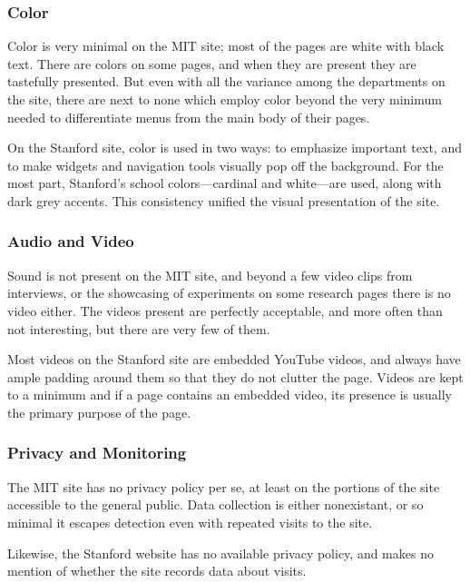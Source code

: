 \subsubsection*{Color}

Color is very minimal on the MIT site; most of the pages are white with black text. There
are colors on some pages, and when they are present they are tastefully presented. But
even with all the variance among the departments on the site, there are next to none
which employ color beyond the very minimum needed to differentiate menus from the main
body of their pages.

On the Stanford site, color is used in two ways: to emphasize important text,
and to make widgets and navigation tools visually pop off the background.
For the most part, Stanford's school colors---cardinal and white---are used,
along with dark grey accents. This consistency unified the visual presentation
of the site.

\subsubsection*{Audio and Video}

Sound is not present on the MIT site, and beyond a few video clips from interviews, or the
showcasing of experiments on some research pages there is no video either. The videos
present are perfectly acceptable, and more often than not interesting, but there are very
few of them.

Most videos on the Stanford site are embedded YouTube videos, and always have ample
padding around them so that they do not clutter the page. Videos are kept to a
minimum and if a page contains an embedded video, its presence is usually the
primary purpose of the page.

\subsubsection*{Privacy and Monitoring}

The MIT site has no privacy policy per se, at least on the portions of the site accessible to the
general public. Data collection is either nonexistant, or so
minimal it escapes detection even with repeated visits to the site.

Likewise, the Stanford website has no available privacy policy, and makes no mention
of whether the site records data about visits.
